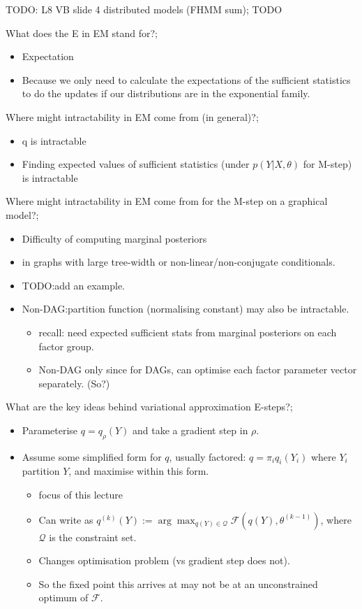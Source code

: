 \documentclass{article}
\begin{document}
TODO: L8 VB slide 4 distributed models (FHMM sum); TODO

What does the E in EM stand for?; \begin{itemize} \item Expectation \item Because we only need to calculate the expectations of the sufficient statistics to do the updates if our distributions are in the exponential family.  \end{itemize}

Where might intractability in EM come from (in general)?; \begin{itemize} \item q is intractable \item Finding expected values of sufficient statistics (under $p(Y|X,\theta)$ for M-step) is intractable \end{itemize}

Where might intractability in EM come from for the M-step on a graphical model?; \begin{itemize} \item Difficulty of computing marginal posteriors \item in graphs with large tree-width or non-linear/non-conjugate conditionals.  \item TODO:add an example.  \item Non-DAG:partition function (normalising constant) may also be intractable.  \begin{itemize} \item recall: need expected sufficient stats from marginal posteriors on each factor group.  \item Non-DAG only since for DAGs, can optimise each factor parameter vector separately. (So?) \end{itemize} \end{itemize}

What are the key ideas behind variational approximation E-steps?; \begin{itemize} \item Parameterise $q=q_{\rho}(Y)$ and take a gradient step in $\rho$.  \item Assume some simplified form for $q$, usually factored: $q=\pi_i q_i(Y_i)$ where $Y_i$ partition $Y$, and maximise within this form.  \begin{itemize} \item focus of this lecture \item Can write as $q^{(k)}(Y):=\arg\max_{q(Y)\in\mathcal{Q}}\mathcal{F}(q(Y),\theta^{(k-1)})$, where $\mathcal{Q}$ is the constraint set.  \item Changes optimisation problem (vs gradient step does not).  \item So the fixed point this arrives at may not be at an unconstrained optimum of $\mathcal{F}$.  \end{itemize} \end{itemize}
\end{document}
